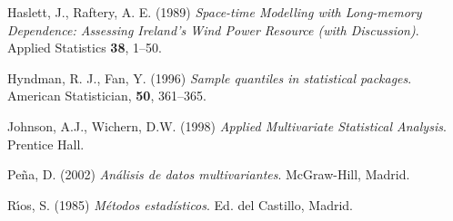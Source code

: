 \documentclass[12pt,a4paper]{article}
\begin{document}
\begin{thebibliography}{10}

Haslett, J., Raftery, A. E. (1989) \emph{Space-time Modelling with
   Long-memory Dependence: Assessing Ireland's Wind Power Resource
   (with Discussion)}. Applied Statistics \textbf{38}, 1--50.

Hyndman, R. J., Fan, Y. (1996) \emph{Sample quantiles in statistical
     packages}. American Statistician, \textbf{50}, 361--365.

Johnson, A.J., Wichern, D.W. (1998) \emph{Applied Multivariate Statistical
      Analysis}. Prentice Hall.

Pe\~{n}a, D. (2002) \emph{An\'alisis de datos multivariantes}. McGraw-Hill, Madrid.

R\'{\i}os, S. (1985) \emph{M\'etodos estad\'isticos}. Ed. del Castillo, Madrid.




\end{thebibliography}
\end{document}
